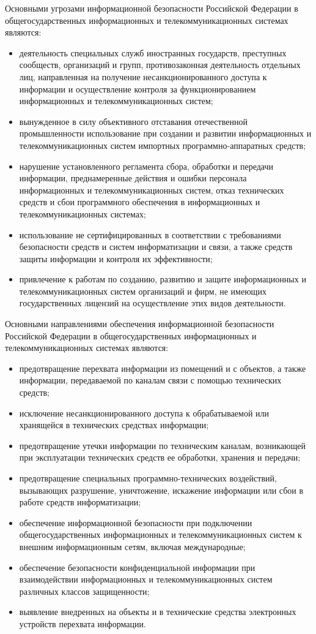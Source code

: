 Основными угрозами информационной безопасности Российской Федерации в общегосударственных информационных и телекоммуникационных системах являются:
\begin{itemize}
	\item деятельность специальных служб иностранных государств, преступных сообществ, организаций и групп, противозаконная деятельность отдельных лиц, направленная на получение несанкционированного доступа к информации и осуществление контроля за функционированием информационных и телекоммуникационных систем;
	\item вынужденное в силу объективного отставания отечественной промышленности использование при создании и развитии информационных и телекоммуникационных систем импортных программно-аппаратных средств;
	\item нарушение установленного регламента сбора, обработки и передачи информации, преднамеренные действия и ошибки персонала информационных и телекоммуникационных систем, отказ технических средств и сбои программного обеспечения в информационных и телекоммуникационных системах;
	\item использование не сертифицированных в соответствии с требованиями безопасности средств и систем информатизации и связи, а также средств защиты информации и контроля их эффективности;
	\item привлечение к работам по созданию, развитию и защите информационных и телекоммуникационных систем организаций и фирм, не имеющих государственных лицензий на осуществление этих видов деятельности.
\end{itemize}

Основными направлениями обеспечения информационной безопасности Российской Федерации в общегосударственных информационных и телекоммуникационных системах являются:
\begin{itemize}
	\item предотвращение перехвата информации из помещений и с объектов, а также информации, передаваемой по каналам связи с помощью технических средств;
	\item исключение несанкционированного доступа к обрабатываемой или хранящейся в технических средствах информации;
	\item предотвращение утечки информации по техническим каналам, возникающей при эксплуатации технических средств ее обработки, хранения и передачи;
	\item предотвращение специальных программно-технических воздействий, вызывающих разрушение, уничтожение, искажение информации или сбои в работе средств информатизации;
	\item обеспечение информационной безопасности при подключении общегосударственных информационных и телекоммуникационных систем к внешним информационным сетям, включая международные;
	\item обеспечение безопасности конфиденциальной информации при взаимодействии информационных и телекоммуникационных систем различных классов защищенности;
	\item выявление внедренных на объекты и в технические средства электронных устройств перехвата информации.
\end{itemize}

